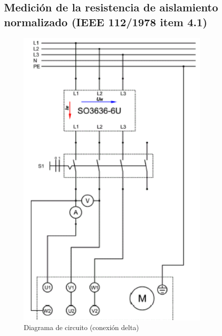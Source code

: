 \documentclass[a4paper,12pt]{article}
\begin{document}
\subsection[Medición de la resistencia de aislamiento normalizado IEEE 112/1978]{Medición de la resistencia de aislamiento normalizado (IEEE 112/1978 item 4.1)}
\begin{figure}[H]
        \centering
        \includegraphics[scale = 0.95]{e1.png}
        \caption{Diagrama de circuito (conexión delta)}
\end{figure}
\end{document}
